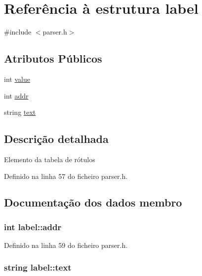 \hypertarget{structlabel}{\section{Referência à estrutura label}
\label{structlabel}
}


{\ttfamily \#include $<$parser.\-h$>$}

\subsection*{Atributos Públicos}
\begin{DoxyCompactItemize}
\item 
int \hyperlink{structlabel_ac0cdaf20932b7fe75988a1d08510b72c}{value}
\item 
int \hyperlink{structlabel_af670c52b4f6b3aeaadc0ec95334e6e52}{addr}
\item 
string \hyperlink{structlabel_a119fc486bd92631742a9fe2cf278d4df}{text}
\end{DoxyCompactItemize}


\subsection{Descrição detalhada}
Elemento da tabela de rótulos 

Definido na linha 57 do ficheiro parser.\-h.



\subsection{Documentação dos dados membro}
\hypertarget{structlabel_af670c52b4f6b3aeaadc0ec95334e6e52}{
\subsubsection[{addr}]{\setlength{\rightskip}{0pt plus 5cm}int label\-::addr}}\label{structlabel_af670c52b4f6b3aeaadc0ec95334e6e52}


Definido na linha 59 do ficheiro parser.\-h.

\hypertarget{structlabel_a119fc486bd92631742a9fe2cf278d4df}{
\subsubsection[{text}]{\setlength{\rightskip}{0pt plus 5cm}string label\-::text}}\label{structlabel_a119fc486bd92631742a9fe2cf278d4df}


